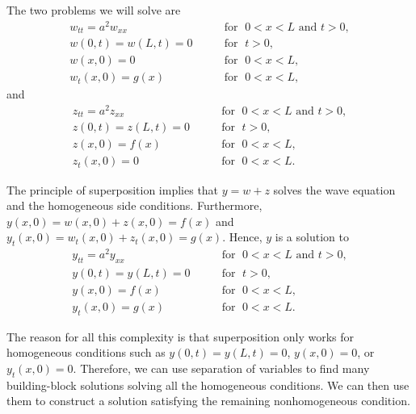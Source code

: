 The two problems we will solve are
\begin{equation} \label{wave:weq}
\begin{array}{ll}
w_{tt} = a^2 w_{xx} & \qquad \text{for } \; 0 < x < L \text{ and } t > 0, \\
w(0,t) = w(L,t) = 0 & \qquad \text{for } \; t > 0,  \\
w(x,0) = 0 & \qquad \text{for } \; 0 < x < L , \\
w_t(x,0) = g(x) & \qquad \text{for } \; 0 < x < L ,
\end{array}
\end{equation}
and
\begin{equation} \label{wave:zeq}
\begin{array}{ll}
z_{tt} = a^2 z_{xx} & \qquad \text{for } \; 0 < x < L \text{ and } t > 0, \\
z(0,t) = z(L,t) = 0 & \qquad \text{for } \; t > 0,  \\
z(x,0) = f(x) & \qquad \text{for } \; 0 < x < L , \\
z_t(x,0) = 0 & \qquad \text{for } \; 0 < x < L .
\end{array}
\end{equation}

The principle of superposition implies that
$y = w + z$ solves the wave equation and the homogeneous
side conditions.
Furthermore,
$y(x,0) = w(x,0) + z(x,0) = f(x)$ and
$y_t(x,0) = w_t(x,0) + z_t(x,0) = g(x)$.  Hence, $y$ is
a solution to
\begin{equation} \label{wave:yeq}
\begin{array}{ll}
y_{tt} = a^2 y_{xx}  & \qquad \text{for } \; 0 < x < L \text{ and } t > 0,  \\
y(0,t) = y(L,t) = 0  & \qquad \text{for } \; t > 0,  \\
y(x,0) = f(x) & \qquad \text{for } \; 0 < x < L , \\
y_t(x,0) = g(x) & \qquad \text{for } \; 0 < x < L .
\end{array}
\end{equation}

The reason for all this complexity is that superposition only works for
homogeneous conditions such as
$y(0,t) = y(L,t) = 0$, $y(x,0) = 0$, or $y_t(x,0) = 0$.  Therefore,
we can
use separation of variables to find many building-block
solutions solving all the homogeneous conditions.  We can then use them to
construct a solution satisfying the remaining nonhomogeneous condition.

